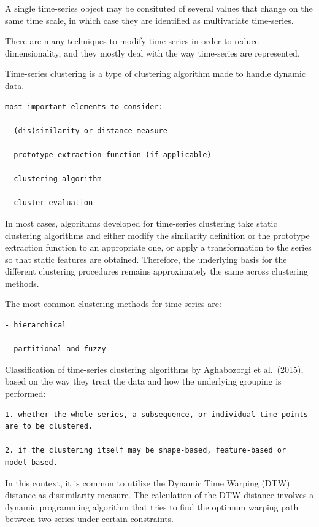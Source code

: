 \documentclass[
]{book}
\begin{document}
A single time-series object may be consituted of several values that change on the same time scale, in which case they are identified as multivariate time-series.

There are many techniques to modify time-series in order to reduce dimensionality, and they mostly deal with the way time-series are represented.

Time-series clustering is a type of clustering algorithm made to handle dynamic data.

\begin{verbatim}
most important elements to consider:

- (dis)similarity or distance measure

- prototype extraction function (if applicable)

- clustering algorithm

- cluster evaluation
\end{verbatim}

In most cases, algorithms developed for time-series clustering take static clustering algorithms and either modify the similarity definition or the prototype extraction function to an appropriate one, or apply a transformation to the series so that static features are obtained. Therefore, the underlying basis for the different clustering procedures remains approximately the same across clustering methods.

The most common clustering methods for time-series are:

\begin{verbatim}
- hierarchical

- partitional and fuzzy
\end{verbatim}

Classification of time-series clustering algorithms by Aghabozorgi et al.~(2015), based on the way they treat the data and how the underlying grouping is performed:

\begin{verbatim}
1. whether the whole series, a subsequence, or individual time points are to be clustered.

2. if the clustering itself may be shape-based, feature-based or model-based.
\end{verbatim}

In this context, it is common to utilize the Dynamic Time Warping (DTW) distance as dissimilarity measure. The calculation of the DTW distance involves a dynamic programming algorithm that tries to find the optimum warping path between two series under certain constraints.
\end{document}
